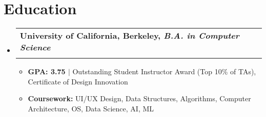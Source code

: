\documentclass[letterpaper,11pt]{article}
\makeatletter
\newcommand{\resumeItem}[1]{
  \item\small{
    {#1 \vspace{2pt}}
  }
}
\newcommand{\resumeSubheading}[4]{
  \vspace{-1pt}\item
    \begin{tabular*}{0.97\textwidth}[t]{l@{\extracolsep{\fill}}r}
      \textbf{#1} & #2 \\
      \textit{\small#3} & \textit{\small #4} \\
    \end{tabular*}\vspace{-5pt}
}
\newcommand{\resumeSubHeadingListStart}{\begin{itemize}[leftmargin=0.15in, label={}]}
\newcommand{\resumeSubHeadingListEnd}{\end{itemize}}
\newcommand{\resumeItemListStart}{\begin{itemize}}
\newcommand{\resumeItemListEnd}{\end{itemize}\vspace{-5pt}}
\makeatother
\begin{document}
\section{Education}
  \resumeSubHeadingListStart
    \resumeSubheading
      {University of California, Berkeley, \textnormal{\textit{B.A. in Computer Science}}}{}
      {}{}
      \vspace{-15pt}
      \resumeItemListStart
      \resumeItem{\textbf{GPA: 3.75 $|$}{ Outstanding Student Instructor Award (Top 10\% of TAs)}, Certificate of Design Innovation}
      \resumeItem{\textbf{Coursework:} UI/UX Design, Data Structures, Algorithms, Computer Architecture, OS, Data Science, AI, ML}
      \resumeItemListEnd
  \resumeSubHeadingListEnd


\end{document}
